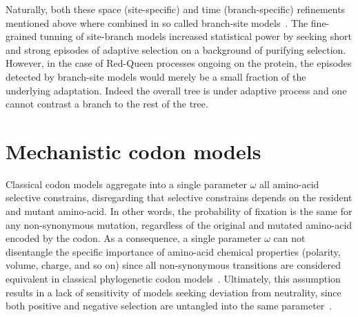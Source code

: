 Naturally, both these space (site-specific) and time (branch-specific) refinements mentioned above where combined in so called branch-site models~\citep{Yang2002, Zhang2004, Pond2011}.
The fine-grained tunning of site-branch models increased statistical power by seeking short and strong episodes of adaptive selection on a background of purifying selection.
However, in the case of Red-Queen processes ongoing on the protein, the episodes detected by branch-site models would merely be a small fraction of the underlying adaptation.
Indeed the overall tree is under adaptive process and one cannot contrast a branch to the rest of the tree.

%


\section{Mechanistic {codon} models}
\label{sec:intro-mechanistic-codon-models}

Classical \gls{codon} models aggregate into a single parameter $\omega$ all amino-acid selective constrains, disregarding that selective constrains depends on the resident and mutant amino-acid.
In other words, the probability of fixation is the same for any non-synonymous mutation, regardless of the original and mutated amino-acid encoded by the \gls{codon}.
As a consequence, a single parameter $\omega$ can not disentangle the specific importance of amino-acid chemical properties (polarity, volume, charge, and so on) since all non-synonymous {transitions} are considered equivalent in classical phylogenetic \gls{codon} models~\citep{Dutheil2008}.
Ultimately, this assumption results in a lack of sensitivity of models seeking deviation from neutrality, since both positive and negative selection are untangled into the same parameter~\citep{Rodrigue2008a}.

